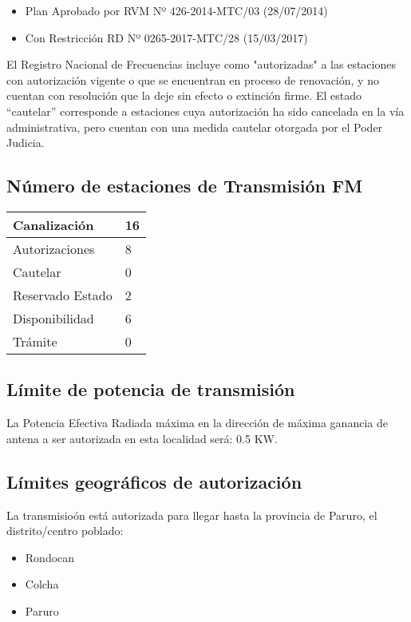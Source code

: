 \documentclass[a4paper]{IEEEtran} %
\begin{document}
\begin{itemize}
	\item Plan Aprobado por RVM Nº 426-2014-MTC/03 (28/07/2014)
	\item Con Restricción RD Nº 0265-2017-MTC/28 (15/03/2017)
\end{itemize}

El Registro Nacional de Frecuencias incluye como "autorizadas" a las estaciones con autorización vigente o que se encuentran en proceso de renovación, y no cuentan con resolución que la deje sin efecto o extinción firme. El estado “cautelar” corresponde a estaciones cuya autorización ha sido cancelada en la vía administrativa, pero cuentan con una medida cautelar otorgada por el Poder Judicia.

\subsection{Número de estaciones de Transmisión FM}

\begin{tabular}{|l|l|} \hline
	Canalización 			& 16 \\ \hline
	Autorizaciones			& 8 \\ \hline
	Cautelar				& 0 \\ \hline
	Reservado Estado		& 2 \\ \hline
	Disponibilidad			& 6 \\ \hline
	Trámite					& 0 \\ \hline 
\end{tabular}

\subsection{Límite de potencia de transmisión}

La Potencia Efectiva Radiada máxima en la dirección de máxima ganancia de antena a ser autorizada en esta localidad será: 0.5 KW.

\subsection{Límites geográficos de autorización}

La transmisioón está autorizada para llegar hasta la provincia de Paruro, el distrito/centro poblado:

\begin{itemize}
	\item Rondocan
	\item Colcha
	\item Paruro
\end{itemize}
\end{document}
